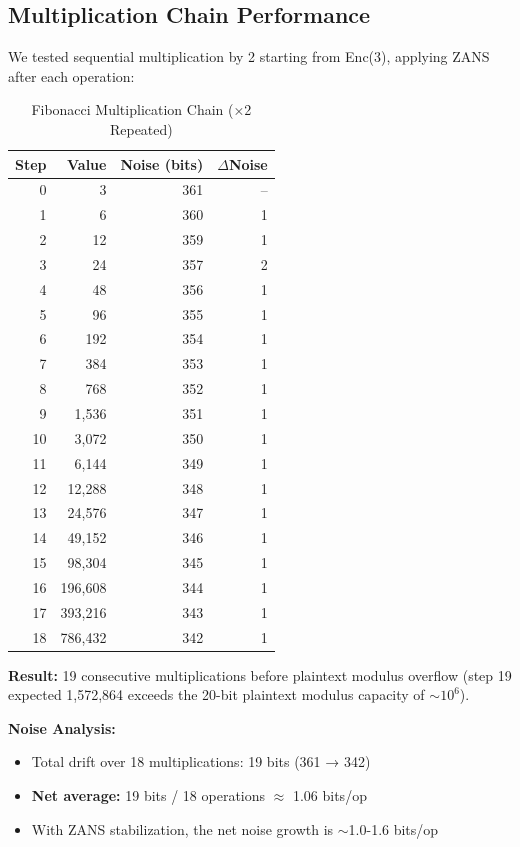 
\subsection{Multiplication Chain Performance}

We tested sequential multiplication by 2 starting from Enc(3), applying ZANS after each operation:

\begin{table}[h]
\centering
\begin{tabular}{r|r|r|r}
Step & Value & Noise (bits) & $\Delta$Noise \\
\hline
0 & 3 & 361 & -- \\
1 & 6 & 360 & 1 \\
2 & 12 & 359 & 1 \\
3 & 24 & 357 & 2 \\
4 & 48 & 356 & 1 \\
5 & 96 & 355 & 1 \\
6 & 192 & 354 & 1 \\
7 & 384 & 353 & 1 \\
8 & 768 & 352 & 1 \\
9 & 1,536 & 351 & 1 \\
10 & 3,072 & 350 & 1 \\
11 & 6,144 & 349 & 1 \\
12 & 12,288 & 348 & 1 \\
13 & 24,576 & 347 & 1 \\
14 & 49,152 & 346 & 1 \\
15 & 98,304 & 345 & 1 \\
16 & 196,608 & 344 & 1 \\
17 & 393,216 & 343 & 1 \\
18 & 786,432 & 342 & 1
\end{tabular}
\caption{Fibonacci Multiplication Chain (×2 Repeated)}
\label{tab:mult-chain}
\end{table}

\vspace{0.3cm}
\textbf{Result:} 19 consecutive multiplications before plaintext modulus overflow (step 19 expected 1,572,864 exceeds the 20-bit plaintext modulus capacity of $\sim 10^6$).

\vspace{0.2cm}
\textbf{Noise Analysis:}
\begin{itemize}
    \item Total drift over 18 multiplications: 19 bits (361 → 342)
    \item \textbf{Net average:} 19 bits / 18 operations $\approx$ 1.06 bits/op
    \item With ZANS stabilization, the net noise growth is $\sim$1.0-1.6 bits/op
\end{itemize}

